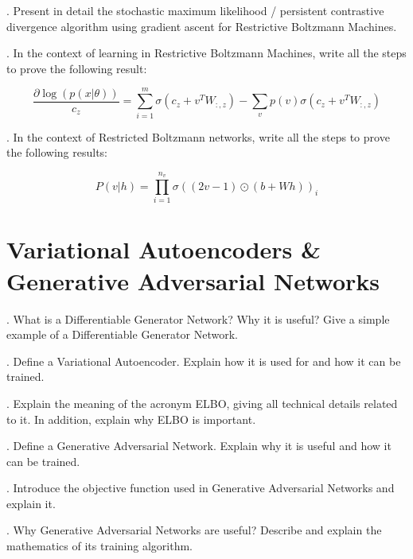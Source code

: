 . Present in detail the stochastic maximum likelihood / persistent contrastive divergence algorithm using gradient ascent for Restrictive Boltzmann Machines.

\newpage
{}. In the context of learning in Restrictive Boltzmann Machines, write all the steps to prove the following result:

$$ \frac{\partial \log \left( p(x \vert \theta) \right)}{ c_z } = \sum_{i=1}^{m} \sigma \left(  c_z + v^{T} W_{:, z} \right) - \sum_{v} p(v) \sigma \left( c_z + v^{T} W_{:, z} \right)   $$


. In the context of Restricted Boltzmann networks, write all the steps to prove the following results:

$$ P(v \vert h) = \prod_{i=1}^{n_v} \sigma \left( (2v -1) \odot (b + Wh) \right)_i     $$


\section{ Variational Autoencoders \& Generative Adversarial Networks}

. What is a Differentiable Generator Network? Why it is useful? Give a simple example of a Differentiable Generator Network.

. Define a Variational Autoencoder. Explain how it is used for and how it can be trained.

. Explain the meaning of the acronym ELBO, giving all technical details related to it. In addition, explain why ELBO is important.


. Define a Generative Adversarial Network. Explain why it is useful and how it can be trained. 


. Introduce the objective function used in Generative Adversarial Networks and explain it.

. Why Generative Adversarial Networks are useful? Describe and explain the mathematics of its training algorithm.

